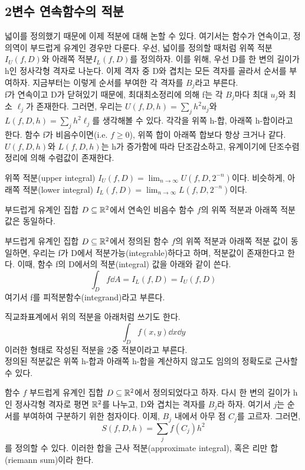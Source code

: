 \subsection{2변수 연속함수의 적분}
넓이를 정의했기 때문에 이제 적분에 대해 논할 수 있다. 여기서는 함수가 연속이고, 정의역이 부드럽게 유계인 경우만 다룬다. 우선, 넓이를 정의할 때처럼 위쪽 적분 $I_U(f,D)$와 아래쪽 적분$I_L(f,D)$를 정의하자. 이를 위해, 우선 D를 한 변의 길이가 h인 정사각형 격자로 나눈다. 이제 격자 중 D와 겹치는 모든 격자를 골라서 순서를 부여하자. 지금부터는 이렇게 순서를 부여한 각 격자를 $B_j$라고 부른다.\\
f가 연속이고 D가 닫혀있기 때문에, 최대최소정리에 의해 f는 각 $B_j$마다 최대 $u_j$와 최소 $\ell_j$가 존재한다. 그러면, 우리는 $U(f,D,h)=\sum_j h^2 u_j$와 $L(f,D,h)=\sum_j h^2 \ell_j$를 생각해볼 수 있다. 각각을 위쪽 h-합, 아래쪽 h-합이라고 한다. 함수 f가 비음수이면(i.e. $f\ge 0$), 위쪽 합이 아래쪽 합보다 항상 크거나 같다.\\
$U(f,D,h)$와 $L(f,D,h)$는 h가 증가함에 따라 단조감소하고, 유계이기에 단조수렴정리에 의해 수렴값이 존재한다.
\begin{definition}[위쪽/아래쪽 적분]
위쪽 적분(upper integral) $I_U(f,D)=\lim_{n\to\infty}U(f,D,2^{-n})$이다. 비슷하게, 아래쪽 적분(lower integral) $I_L(f,D)=\lim_{n\to\infty}L(f,D,2^{-n})$이다.
\end{definition}
\begin{theorem}
부드럽게 유계인 집합 $D\subseteq\mathbb{R}^2$에서 연속인 비음수 함수 $f$의 위쪽 적분과 아래쪽 적분 값은 동일하다. 
\end{theorem}
\begin{definition}
부드럽게 유계인 집합 $D\subseteq\mathbb{R}^2$에서 정의된 함수 $f$의 위쪽 적분과 아래쪽 적분 값이 동일하면, 우리는 f가 D에서 적분가능(integrable)하다고 하며, 적분값이 존재한다고 한다. 이때, 함수 f의 D에서의 적분(integral) 값을 아래와 같이 쓴다.
$$
\int_Df\dd A=I_L(f,D)=I_U(f,D)
$$
여기서 f를 피적분함수(integrand)라고 부른다.
\end{definition}
직교좌표계에서 위의 적분을 아래처럼 쓰기도 한다.
$$
\int_Df(x,y)\dd x\dd y
$$
이러한 형태로 작성된 적분을 2중 적분이라고 부른다.\\
정의된 적분값은 위쪽 h-합과 아래쪽 h-합을 계산하지 않고도 임의의 정확도로 근사할 수 있다.
\begin{definition}[근사 적분, 리만 합]
함수 $f$ 부드럽게 유계인 집합 $D\subseteq\mathbb{R}^2$에서 정의되었다고 하자. 다시 한 변의 길이가 h인 정사각형 격자로 평면 $\mathbb{R}^2$를 나누고, D와 겹치는 격자를 $B_j$라 하자. 여기서 $j$는 순서를 부여하여 구분하기 위한 첨자이다. 이제, $B_j$ 내에서 아무 점 $C_j$를 고르자. 그러면,
$$
S(f,D,h)=\sum_jf(C_j)h^2
$$
를 정의할 수 있다. 이러한 합을 근사 적분(approximate integral), 혹은 리만 합(riemann sum)이라 한다.
\end{definition}
